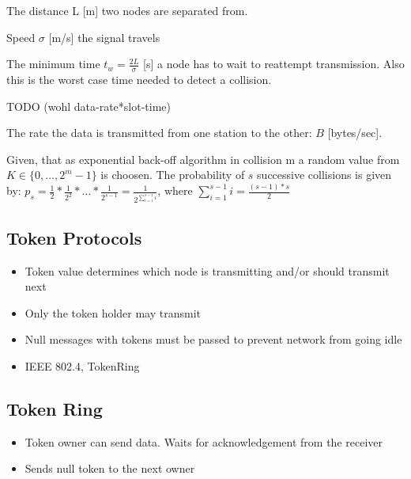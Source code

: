 \begin{definition}
The distance L [m] two nodes are separated from.
\end{definition}

\begin{definition}
Speed $\sigma$ [m/s] the signal travels 
\end{definition}

\begin{definition}
The minimum time $t_w = \frac{2L}{\sigma}$ [s] a node has to wait to reattempt transmission. Also this is the worst case time needed to detect a collision.
\end{definition}

\begin{definition}
TODO (wohl data-rate*slot-time)
\end{definition}

\begin{definition}
The rate the data is transmitted from one station to the other: $B$ [bytes/sec].
\end{definition}

\begin{theorem}
Given, that as exponential back-off algorithm in collision m a random value from $K \in \{0, ..., 2^m-1 \}$ is choosen. The probability of $s$ successive collisions is given by: $p_s = \frac{1}{2} *\frac{1}{2^2} * ... * \frac{1}{2^{s-1}} = \frac{1}{2^{ \sum\limits_{i= 1}^{s-1} i} }$, where $\sum\limits_{i = 1}^{s-1} i = \frac{(s-1)*s}{2}$
\end{theorem}

\subsection{Token Protocols}
\begin{itemize}[noitemsep]
\item Token value determines which node is transmitting and/or should transmit next
\item Only the token holder may transmit
\item Null messages with tokens must be passed to prevent network from going idle
\item IEEE 802.4, TokenRing
\end{itemize}

\subsection{Token Ring}
\begin{itemize}[noitemsep]
\item Token owner can send data. Waits for acknowledgement from the receiver
\item Sends null token to the next owner
\end{itemize}


